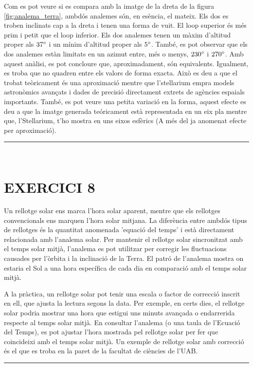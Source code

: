 \documentclass[a4paper, 11pt]{article}
\begin{document}
\noindent Com es pot veure si es compara amb la imatge de la dreta de la figura \ref{fig:analema_terra}, ambdós analemes són, en esència, el mateix. Els dos es troben inclinats cap a la dreta i tenen una forma de vuit. El loop superior és més prim i petit que el loop inferior. Els dos analemes tenen un màxim d'altitud proper als $37 \degree$ i un mínim d'altitud proper als $5 \degree$. També, es pot observar que els dos analemes estàn limitats en un azimut entre, més o menys, $230 \degree$ i $270 \degree$. Amb aquest anàlisi, es pot concloure que, aproximadament, són equivalents. Igualment, es troba que no quadren entre els valors de forma exacta. Això es deu a que el trobat teòricament és una aproximació mentre que l'stellarium empra models astronòmics avançats i dades de precisió directament extrets de agències espaials importants. També, es pot veure una petita variació en la forma, aquest efecte es deu a que la imatge generada teóricament està representada en un eix pla mentre que, l'Stellarium, t'ho mostra en uns eixos esfèrics (A més del ja anomenat efecte per aproximació).

\vspace{10mm}
\hrule\
\vspace{5mm}


\section*{EXERCICI 8}
\noindent Un rellotge solar ens marca l'hora solar aparent, mentre que els rellotges convencionals ens marquen l'hora solar mitjana. La diferència entre ambdós tipus de rellotges és la quantitat anomenada 'equació del temps' i està directament relacionada amb l'analema solar. Per mantenir el rellotge solar sincronitzat amb el temps solar mitjà, l'analema es pot utilitzar per corregir les fluctuacions causades per l'òrbita i la inclinació de la Terra. El patró de l'analema mostra on estaria el Sol a una hora específica de cada dia en comparació amb el temps solar mitjà.

\vspace{2mm}

\noindent A la pràctica, un rellotge solar pot tenir una escala o factor de correcció inscrit en ell, que ajusta la lectura segons la data. Per exemple, en certs dies, el rellotge solar podria mostrar una hora que estigui uns minuts avançada o endarrerida respecte al temps solar mitjà. En consultar l'analema (o una taula de l'Ecuació del Temps), es pot ajustar l'hora mostrada pel rellotge solar per fer que coincideixi amb el temps solar mitjà. Un exemple de rellotge solar amb correcció és el que es troba en la paret de la facultat de ciències de l'UAB. 
\vspace{10mm}
\hrule\
\vspace{5mm}
\end{document}
